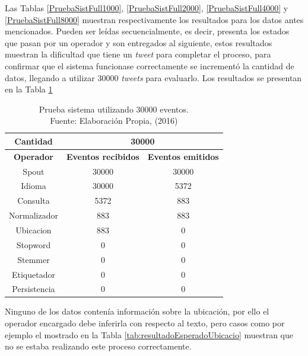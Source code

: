 Las Tablas \ref{PruebaSistFull1000}, \ref{PruebaSistFull2000}, \ref{PruebaSistFull4000} y \ref{PruebaSistFull8000} muestran respectivamente los resultados para los datos antes mencionados. Pueden ser leídas secuencialmente, es decir, presenta los estados que pasan por un operador y son entregados al siguiente, estos resultados muestran la dificultad que tiene un \textit{tweet} para completar el proceso, para confirmar que el sistema funcionase correctamente se incrementó la cantidad de datos, llegando a utilizar 30000 \textit{tweets} para evaluarlo. Los resultados se presentan en la Tabla \ref{tab:PruebaSistFull30000}

\begin{table}[H]
\centering
\caption[Prueba sistema utilizando 30000 eventos.]{Prueba sistema utilizando 30000 eventos.\\Fuente: Elaboración Propia, (2016)}
\label{tab:PruebaSistFull30000}
\begin{tabular}{|c|c|c|}
\hline
\textbf{Cantidad} & \multicolumn{2}{c|}{\textbf{30000}} \\ \hline
\textbf{Operador} & \multicolumn{1}{c|}{\textbf{Eventos recibidos}} & \multicolumn{1}{c|}{\textbf{Eventos emitidos}} \\ \hline
Spout & 30000 & 30000 \\ \hline
Idioma & 30000 & 5372 \\ \hline
Consulta & 5372 & 883 \\ \hline
Normalizador & 883 & 883 \\ \hline
Ubicacion & 883 & 0 \\ \hline
Stopword & 0 & 0 \\ \hline
Stemmer & 0 & 0 \\ \hline
Etiquetador & 0 & 0 \\ \hline
Persistencia & 0 & 0 \\ \hline
\end{tabular}
\end{table}

Ninguno de los datos contenía información sobre la ubicación, por ello el operador encargado debe inferirla con respecto al texto, pero casos como por ejemplo el mostrado en la Tabla \ref{tab:resultadoEsperadoUbicacio} muestran que no se estaba realizando este proceso correctamente.

